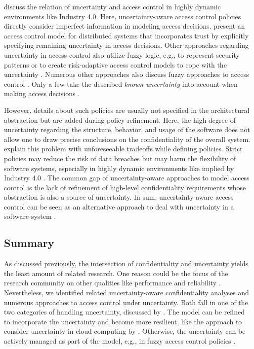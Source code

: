 \textcite{bures_capturing_2020} discuss the relation of uncertainty and access control in highly dynamic environments like Industry 4.0.
Here, uncertainty-aware access control policies directly consider imperfect information in modeling access decisions.
\textcite{hengartner_distributed_2007} present an access control model for distributed systems that incorporates trust by explicitly specifying remaining uncertainty in access decisions. 
Other approaches regarding uncertainty in access control also utilize fuzzy logic, e.g., to represent security patterns \cite{hosmer_using_1992} or to create risk-adaptive access control models to cope with the uncertainty \cite{cheng_fuzzy_2007}. 
Numerous other approaches also discuss fuzzy approaches to access control \cite{ni_risk-based_2010,martinez-garcia_fuzzy_2011,salim_approach_2011,molloy_risk-based_2012,mahalle_fuzzy_2013,santos_dynamic_2014}.
Only a few take the described \emph{known uncertainty} into account when making access decisions \cite{ardagna_supporting_2006,cuppens_modelling_2003}.

However, details about such policies are usually not specified in the architectural abstraction but are added during policy refinement. 
Here, the high degree of uncertainty regarding the structure, behavior, and usage of the software does not allow one to draw precise conclusions on the confidentiality of the overall system. 
\textcite{cheng_fuzzy_2007} explain this problem with unforeseeable tradeoffs while defining policies. 
Strict policies may reduce the risk of data breaches but may harm the flexibility of software systems, especially in highly dynamic environments like implied by Industry 4.0 \cite{bures_capturing_2020}. 
The common gap of uncertainty-aware approaches to model access control is the lack of refinement of high-level confidentiality requirements whose abstraction is also a source of uncertainty.
In sum, uncertainty-aware access control can be seen as an alternative approach to deal with uncertainty in a software system \cite{perez-palacin_dealing_2014}.


\subsection{Summary}

As discussed previously, the intersection of confidentiality and uncertainty yields the least amount of related research.
One reason could be the focus of the research community on other qualities like performance and reliability \cite{hezavehi_uncertainty_2021,sobhy_evaluation_2021}.
Nevertheless, we identified related uncertainty-aware confidentiality analyses and numerous approaches to access control under uncertainty.
Both fall in one of the two categories of handling uncertainty, discussed by \textcite{perez-palacin_dealing_2014}.
The model can be refined to incorporate the uncertainty and become more resilient, like the approach to consider uncertainty in cloud computing by \textcite{tchernykh_towards_2019}.
Otherwise, the uncertainty can be actively managed as part of the model, e.g., in fuzzy access control policies \cite{cheng_fuzzy_2007,ni_risk-based_2010,martinez-garcia_fuzzy_2011}.

